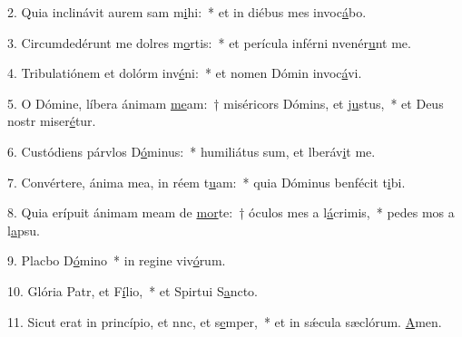 2. Quia inclinávit aurem sam m\uline{i}hi:~* et in diébus mes invoc\uline{á}bo.\par 
3. Circumdedérunt me dolres m\uline{o}rtis:~* et perícula inférni nvenér\uline{u}nt me.\par 
4. Tribulatiónem et dolórm inv\uline{é}ni:~* et nomen Dómin invoc\uline{á}vi.\par 
5. O Dómine, líbera ánimam \uline{me}am:~† miséricors Dómins, et j\uline{u}stus,~* et Deus nostr miser\uline{é}tur.\par 
6. Custódiens párvlos D\uline{ó}minus:~* humiliátus sum, et lberáv\uline{i}t me.\par 
7. Convértere, ánima mea, in réem t\uline{u}am:~* quia Dóminus benfécit t\uline{i}bi.\par 
8. Quia erípuit ánimam meam de \uline{mor}te:~† óculos mes a l\uline{á}crimis,~* pedes mos a l\uline{a}psu.\par 
9. Placbo D\uline{ó}mino~* in regine viv\uline{ó}rum.\par 
10. Glória Patr, et F\uline{í}lio,~* et Spirtui S\uline{a}ncto.\par 
11. Sicut erat in princípio, et nnc, et s\uline{e}mper,~* et in sǽcula sæclórum. \uline{A}men.\par 
